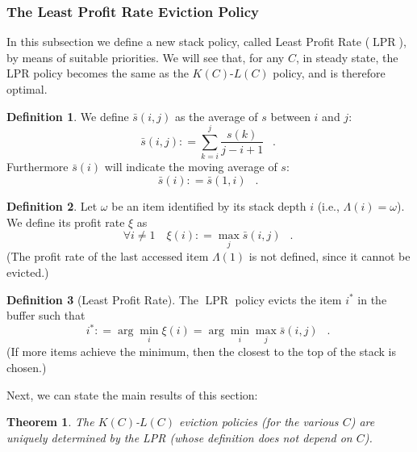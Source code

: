 \documentclass[11pt,a4paper]{article}
\DeclareMathOperator{\lpr}{LPR}
\DeclareMathOperator{\mf}{\enspace .}
\newcommand{\deq}{\mathrel{\mathop:}=}
\newtheorem{theorem}{Theorem}
\theoremstyle{definition}
\newtheorem{definition}{Definition}
\theoremstyle{remark}
\begin{document}
\subsubsection{The Least Profit Rate Eviction Policy}
\label{sec:least-profit-rate}

In this subsection we define a new stack policy, called Least Profit Rate
($\lpr$), by means of suitable priorities. We will see that, for any $C$, in
steady state, the LPR policy becomes the same as the $K(C)$-$L(C)$ policy, and
is therefore optimal.

\begin{definition}
  We define \(\bar s(i,j)\) as the average of \(s\) between \(i\) and \(j\):
  \begin{equation}
    \bar s(i,j) \deq \sum_{k=i}^j \frac{s(k)}{j-i+1} \mf
  \end{equation}
  Furthermore $\bar s(i)$ will indicate the moving average of $s$:
  \begin{equation}
    \bar s(i) \deq \bar s(1, i) \mf    
  \end{equation}
\end{definition}
\begin{definition}
  Let $\omega$ be an item identified by its stack depth $i$ (i.e.,
  $\Lambda(i)=\omega$). We define its profit rate $\xi$ as
  \begin{equation}
    \forall i\neq 1 \quad \xi(i) \deq \max_j \bar s(i,j) \mf
  \end{equation}
  (The profit rate of the last accessed item $\Lambda(1)$ is not defined, since
  it cannot be evicted.)
\end{definition}
\begin{definition}[Least Profit Rate]
  The $\lpr$ policy evicts the item $i^*$ in the buffer such that
  \begin{equation}
    i^* \deq \arg \min_i \xi(i) = \arg \min_i \max_j \bar s(i,j) \mf
  \end{equation}
  (If more items achieve the minimum, then the closest to the top of
   the stack is chosen.)
\end{definition}

Next, we can state the main results of this section:
\begin{theorem}\label{linathm}
  The \(K(C)\)-\(L(C)\) eviction policies (for the various $C$) are
  uniquely determined by the LPR (whose definition does not depend on $C$).
\end{theorem}
\end{document}

